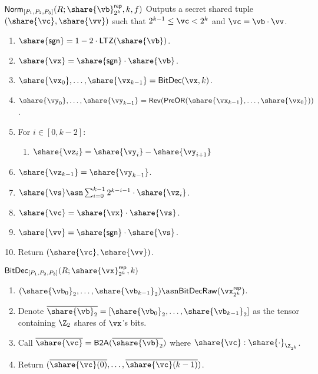 \msubsubsection
  {$\mathsf{Norm}_{[P_1, P_2, P_3]}(R; \share{\vb}^\mathsf{rep}_{2^k}, k, f)$}
  \label{fig:div-norm}
  Outputs a secret shared tuple $(\share{\vc}, \share{\vv})$ such that $2^{k-1} \leq \vc < 2^k$ and $\vc = \vb \cdot \vv$.
  \begin{enumerate}
    \item $\share{\mathsf{sgn}} = 1 - 2 \cdot \mathsf{LTZ}(\share{\vb})$.
    \item $\share{\vx} = \share{\mathsf{sgn}} \cdot \share{\vb}$.
    \item $\share{\vx_0}, \dots, \share{\vx_{k-1}} = \mathsf{BitDec}(\vx, k)$.
    \item $\share{\vy_0}, \dots, \share{\vy_{k-1}} = \mathsf{Rev}(\mathsf{PreOR}(\share{\vx_{k-1}}, \dots, \share{\vx_0}))$.
    \item For $i \in [0, k-2]$:
    \begin{enumerate}
        \item $\share{\vz_i} = \share{\vy_i} - \share{\vy_{i+1}}$
    \end{enumerate}
    \item $\share{\vz_{k-1}} = \share{\vy_{k-1}}$.
    \item $\share{\vs} \asn \sum_{i=0}^{k-1}2^{k-i-1} \cdot \share{\vz_i}$.
    \item $\share{\vc} = \share{\vx} \cdot \share{\vs}$.
    \item $\share{\vv} = \share{\mathsf{sgn}} \cdot \share{\vs}$.
    \item Return $(\share{\vc}, \share{\vv})$.
\end{enumerate}



\msubsubsection
  {$\mathsf{BitDec}_{[P_1, P_2, P_3]}(R; \share{\vx}^\mathsf{rep}_{2^k}, k)$}
  \begin{enumerate}
  \item $(\share{\vb_0}_2, \dots, \share{\vb_{k-1}}_2) \asn \mathsf{BitDecRaw}(\vx^\mathsf{rep}_{2^k})$.
  \item Denote $\overline{\share{\vb}_2} = [\share{\vb_0}_2, \dots, \share{\vb_{k-1}}_2]$ as the tensor containing $\Z_2$ shares of $\vx$'s bits.
  \item Call $\overline{\share{\vc}} = \mathsf{B2A}(\overline{\share{\vb}_2})$ where $\share{\vc}: \share{\cdot}_{\Z_{2^k}}$.
  \item Return $(\overline{\share{\vc}(0)}, \dots, \overline{\share{\vc}(k-1)})$.
\end{enumerate}


